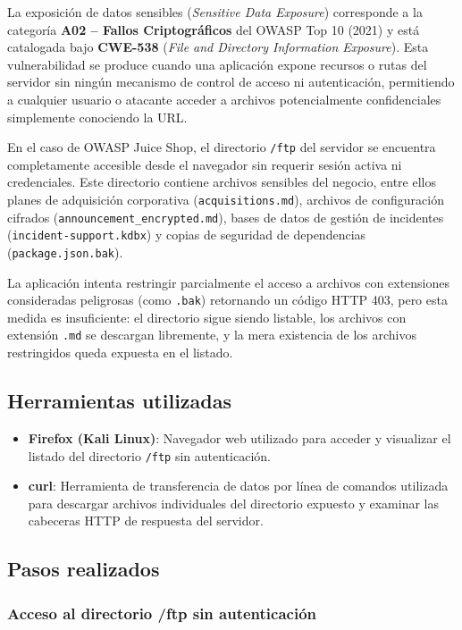 \documentclass[12pt, letterpaper]{article}
\begin{document}
La exposición de datos sensibles (\textit{Sensitive Data Exposure}) corresponde a la categoría \textbf{A02 -- Fallos Criptográficos} del OWASP Top 10 (2021) y está catalogada bajo \textbf{CWE-538} (\textit{File and Directory Information Exposure}). Esta vulnerabilidad se produce cuando una aplicación expone recursos o rutas del servidor sin ningún mecanismo de control de acceso ni autenticación, permitiendo a cualquier usuario o atacante acceder a archivos potencialmente confidenciales simplemente conociendo la URL.

En el caso de OWASP Juice Shop, el directorio \texttt{/ftp} del servidor se encuentra completamente accesible desde el navegador sin requerir sesión activa ni credenciales. Este directorio contiene archivos sensibles del negocio, entre ellos planes de adquisición corporativa (\texttt{acquisitions.md}), archivos de configuración cifrados (\texttt{announcement\_encrypted.md}), bases de datos de gestión de incidentes (\texttt{incident-support.kdbx}) y copias de seguridad de dependencias (\texttt{package.json.bak}).

La aplicación intenta restringir parcialmente el acceso a archivos con extensiones consideradas peligrosas (como \texttt{.bak}) retornando un código HTTP 403, pero esta medida es insuficiente: el directorio sigue siendo listable, los archivos con extensión \texttt{.md} se descargan libremente, y la mera existencia de los archivos restringidos queda expuesta en el listado.

\subsection{Herramientas utilizadas}

\begin{itemize}
  \item \textbf{Firefox (Kali Linux)}: Navegador web utilizado para acceder y visualizar el listado del directorio \texttt{/ftp} sin autenticación.
  \item \textbf{curl}: Herramienta de transferencia de datos por línea de comandos utilizada para descargar archivos individuales del directorio expuesto y examinar las cabeceras HTTP de respuesta del servidor.
\end{itemize}

\subsection{Pasos realizados}

\subsubsection{Acceso al directorio /ftp sin autenticación}
\end{document}
